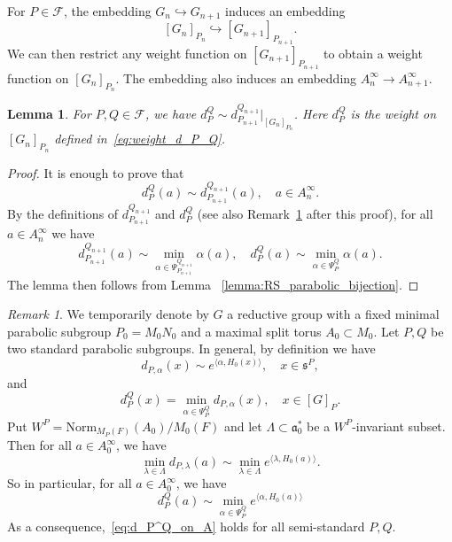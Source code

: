 \documentclass[letterpaper,11pt]{amsart}
\newcommand{\fa}{\mathfrak{a}}
\newcommand{\fs}{\mathfrak{s}}
\newcommand{\cF}{\mathcal{F}}
\newcommand{\<}{\negthickspace}
\theoremstyle{definition}
\theoremstyle{plain}
\newtheorem{lemma}[definition]{Lemma}
\theoremstyle{remark}
\newtheorem{remark}[definition]{Remark}
\numberwithin{equation}{section}
\begin{document}
For $P \in \cF$, the embedding $G_n \hookrightarrow G_{n+1}$
induces an embedding
    \[
    [G_n]_{P_n} \hookrightarrow [G_{n+1}]_{P_{n+1}}.
    \]
We can then restrict any weight function on $[G_{n+1}]_{P_{n+1}}$ to obtain a
weight function on $[G_n]_{P_n}$.
The embedding also induces an embedding $A_n^\infty \to A_{n+1}^\infty$.

\begin{lemma}   \label{lem:weight_J_GL}
For $P, Q \in \cF$, we
have $d_{P}^{Q} \sim d_{P_{n+1}}^{Q_{n+1}}|_{[G_n]_{P_n}}$. Here $d_{P}^Q$ is the weight
on $[G_n]_{P_n}$ defined in~\eqref{eq:weight_d_P_Q}.
\end{lemma}

\begin{proof}
It is enough to prove that
    \[
    d_{P}^Q(a) \sim d_{P_{n+1}}^{Q_{n+1}}(a), \quad
    a \in A_n^\infty.
    \]
By the definitions of $d_{P_{n+1}}^{Q_{n+1}}$ and $d_P^Q$ (see also Remark~\ref{rk:after_the_proof} after this proof),
for all $a \in A_n^\infty$ we have
    \[
    d_{P_{n+1}}^{Q_{n+1}}(a) \sim
    \min_{\alpha \in \Psi_{P_{n+1}}^{Q_{n+1}}} \alpha(a), \quad
    d_{P}^{Q}(a) \sim \min_{\alpha \in \Psi_{P}^{Q}} \alpha(a).
    \]
The lemma then follows from Lemma ~\ref{lemma:RS_parabolic_bijection}.
\end{proof}

\begin{remark}
\label{rk:after_the_proof}
We temporarily denote by $G$ a reductive group with a fixed minimal parabolic subgroup
$P_0 = M_0N_0$ and a maximal split torus $A_0 \subset M_0$.
Let $P, Q$ be two standard parabolic subgroups. In general, by definition we have
    \[
    d_{P, \alpha}(x) \sim e^{\langle \alpha, H_0(x) \rangle},
    \quad x \in \fs^P,
    \]
and
    \[
    d_P^Q(x) = \min_{\alpha \in \Psi_{P}^Q} d_{P, \alpha}(x), \quad
    x \in [G]_P.
    \]
Put $W^P = \mathrm{Norm}_{M_P(F)}(A_0)/M_0(F)$ and let $\Lambda \subset \fa_0^*$
be a $W^P$-invariant subset. Then for all $a \in A_0^\infty$, we have
    \begin{equation} \label{eq:min_d_Plambda_on_A}
    \min_{\lambda \in \Lambda} d_{P,\lambda}(a)
    \sim \min_{\lambda \in \Lambda} e^{\langle \lambda, H_0(a) \rangle}.
     \end{equation}
So in particular, for all $a \in A_0^\infty$, we have
    \begin{equation} \label{eq:d_P^Q_on_A}
    d_P^Q(a) \sim \min_{\alpha \in \Psi_P^Q} e^{\langle \alpha, H_0(a) \rangle}
    \end{equation}
As a consequence,~\eqref{eq:d_P^Q_on_A} holds for all semi-standard $P,Q$.
\end{remark}
\end{document}
